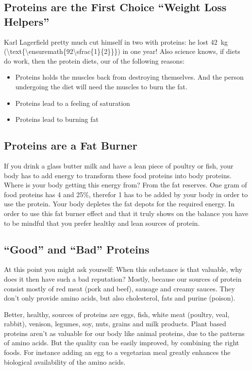 \documentclass[../main.tex]{subfiles}
\begin{document}
  \subsection{Proteins are the First Choice ``Weight Loss Helpers''}

  Karl Lagerfield pretty much cut himself in two with proteins: he lost \SI{42}{\kg}
  (\SI[parse-numbers=false]{\text{\ensuremath{92\sfrac{1}{2}}}}{\lbs}) in one year!
  Also science knows, if diets do work, then the protein diets, our of the following reasons:
  \begin{itemize}
  \item Proteins holds the muscles back from destroying themselves. And the person undergoing the diet will need the muscles  to burn the fat.
  \item Proteins lead to a feeling of saturation
    \item Proteins lead to burning fat
    \end{itemize}

    \subsection{Proteins are a Fat Burner}

    If you drink a glass butter milk and have a lean piece of poultry or fish, your body has to add energy to transform these food proteins into body proteins.
    Where is your body getting this energy from? From the fat reserves.
    One gram of food proteins has \SI{4}{\kcal} and 25\%, therefor \SI{1}{\kcal} has to be added by your body in order to use the protein.
    Your body depletes the fat depots for the required energy.
    In order to use this fat burner effect and that it truly shows on the balance you have to be mindful that you prefer healthy and lean sources of protein.

    \subsection{``Good'' and ``Bad'' Proteins}

    At this point you might ask yourself: When this substance is that valuable, why does it then have such a bad reputation?
    Mostly, because our sources of protein consist mostly of red meat (pork and beef), sausage and creamy sauces.
    They don't only provide amino acids, but also cholesterol, fats and purine (poison).

    Better, healthy, sources of proteins are eggs, fish, white meat (poultry, veal, rabbit), venison, legumes, soy, nuts, grains and milk products.
    Plant based proteins aren't as valuable for our body like animal proteins, due to the patterns of amino acids.
    But the quality can be easily improved, by combining the right foods. For instance adding an egg to a vegetarian meal greatly enhances the
    biological availability of the amino acids.
\end{document}
